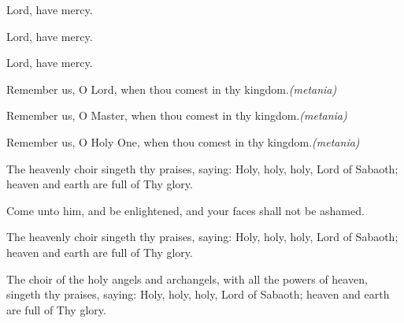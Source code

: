 \documentclass[twoside, letterpaper, 12pt]{report}
\begin{document}

\begin{reader}
\item Lord, have mercy. 
\item Lord, have mercy. 
\item Lord, have mercy. 
\end{reader}


\newcommand\metania{\emph{(metania)}}
Remember us, O Lord, when thou comest in thy kingdom.\metania

Remember us, O Master, when thou comest in thy kingdom.\metania

Remember us, O Holy One, when thou comest in thy kingdom.\metania

The heavenly choir singeth thy praises, saying: Holy, holy, holy, Lord of Sabaoth; heaven and earth are full of Thy glory.

Come unto him, and be enlightened, and your faces shall not be ashamed.

The heavenly choir singeth thy praises, saying: Holy, holy, holy, Lord of Sabaoth; heaven and earth are full of Thy glory.

\emph{\glory}

The choir of the holy angels and archangels, with all the powers of heaven, singeth thy praises, saying: Holy, holy, holy, Lord of Sabaoth; heaven and earth are full of Thy glory.

\emph{\nowandever}









\end{document}

